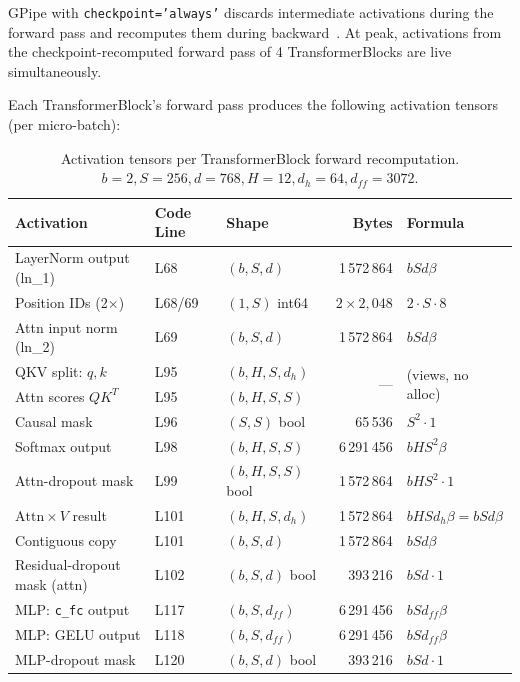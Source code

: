 \documentclass[11pt,a4paper]{article}
\begin{document}
GPipe with \texttt{checkpoint='always'} discards intermediate activations during the forward pass and recomputes them during backward~\cite{chen2016training, huang2019gpipe}.
At peak, activations from the checkpoint-recomputed forward pass of 4 TransformerBlocks are live simultaneously.

Each TransformerBlock's forward pass produces the following activation tensors (per micro-batch):

\begin{table}[h]
\centering
\caption{Activation tensors per TransformerBlock forward recomputation.  $b=2, S=256, d=768, H=12, d_h=64, d_{ff}=3072$.}
\label{tab:activations}
\begin{tabular}{lllrl}
\toprule
\textbf{Activation} & \textbf{Code Line} & \textbf{Shape} & \textbf{Bytes} & \textbf{Formula} \\
\midrule
LayerNorm output (ln\_1)  & L68 & $(b, S, d)$        & 1\,572\,864  & $b S d \beta$ \\
Position IDs (2$\times$)  & L68/69 & $(1, S)$ int64   & $2 \times 2{,}048$ & $2 \cdot S \cdot 8$ \\
Attn input norm (ln\_2)   & L69 & $(b, S, d)$         & 1\,572\,864  & $b S d \beta$  \\
QKV split: $q, k$         & L95 & $(b, H, S, d_h)$   & \multirow{2}{*}{---} & \multirow{2}{*}{(views, no alloc)} \\
Attn scores $Q K^T$       & L95 & $(b, H, S, S)$     & 6\,291\,456  & $b H S^2 \beta$ \\
Causal mask               & L96 & $(S, S)$ bool       & 65\,536      & $S^{2} \cdot 1$ \\
Softmax output            & L98 & $(b, H, S, S)$      & 6\,291\,456  & $b H S^2 \beta$ \\
Attn-dropout mask         & L99 & $(b, H, S, S)$ bool & 1\,572\,864  & $b H S^{2} \cdot 1$ \\
$\text{Attn} \times V$ result       & L101 & $(b, H, S, d_h)$  & 1\,572\,864  & $b H S d_h \beta = b S d \beta$ \\
Contiguous copy           & L101 & $(b, S, d)$         & 1\,572\,864  & $b S d \beta$ \\
Residual-dropout mask (attn) & L102 & $(b, S, d)$ bool & 393\,216     & $b S d \cdot 1$ \\
MLP: \texttt{c\_fc} output & L117 & $(b, S, d_{ff})$  & 6\,291\,456  & $b S d_{ff} \beta$ \\
MLP: GELU output           & L118 & $(b, S, d_{ff})$  & 6\,291\,456  & $b S d_{ff} \beta$ \\
MLP-dropout mask            & L120 & $(b, S, d)$ bool  & 393\,216     & $b S d \cdot 1$ \\
\bottomrule
\end{tabular}
\end{table}
\end{document}

